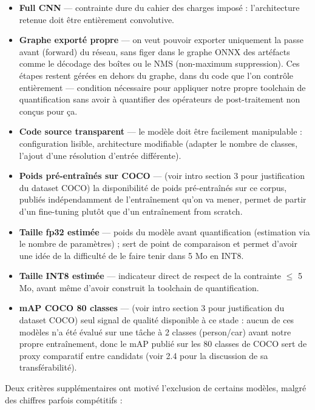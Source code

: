 \documentclass[11pt,a4paper]{article}
\begin{document}
    \begin{itemize}[leftmargin=1.5em]
      \item \textbf{Full CNN} --- contrainte dure du cahier des charges imposé : l'architecture
        retenue doit être entièrement convolutive.
      \item \textbf{Graphe exporté propre} --- on veut pouvoir exporter
        uniquement la passe avant (forward) du réseau, sans figer dans le
        graphe ONNX des artéfacts comme le décodage des boîtes ou le NMS
        (non-maximum suppression). Ces étapes restent gérées en dehors du
        graphe, dans du code que l'on contrôle entièrement --- condition
        nécessaire pour appliquer notre propre toolchain de quantification
        sans avoir à quantifier des opérateurs de post-traitement non
        conçus pour ça.
      \item \textbf{Code source transparent} --- le modèle doit être
        facilement manipulable : configuration lisible, architecture
        modifiable (adapter le nombre de classes, l'ajout d'une résolution
        d'entrée différente).
      \item \textbf{Poids pré-entraînés sur COCO} --- (voir intro section 3 pour justification du dataset COCO) la disponibilité de poids pré-entraînés sur ce corpus, publiés indépendamment de l'entraînement qu'on va mener, permet de partir d'un fine-tuning plutôt que d'un entraînement from scratch.
      \item \textbf{Taille fp32 estimée} --- poids du modèle avant quantification (estimation via le nombre de paramètres) ;
        sert de point de comparaison et permet d'avoir une idée de la difficulté de le faire tenir dans 5 Mo en INT8.
      \item \textbf{Taille INT8 estimée} --- indicateur direct de respect
        de la contrainte $\leq$ 5 Mo, avant même d'avoir construit la
        toolchain de quantification.
      \item \textbf{mAP COCO 80 classes} --- (voir intro section 3 pour justification du dataset COCO) seul signal de qualité
        disponible à ce stade : aucun de ces modèles n'a été évalué sur une
        tâche à 2 classes (person/car) avant notre propre entraînement,
        donc le mAP publié sur les 80 classes de COCO sert de proxy
        comparatif entre candidats (voir 2.4 pour la discussion de sa
        transférabilité).
    \end{itemize}
    
    Deux critères supplémentaires ont motivé l'exclusion de certains
    modèles, malgré des chiffres parfois compétitifs :
    
\end{document}
